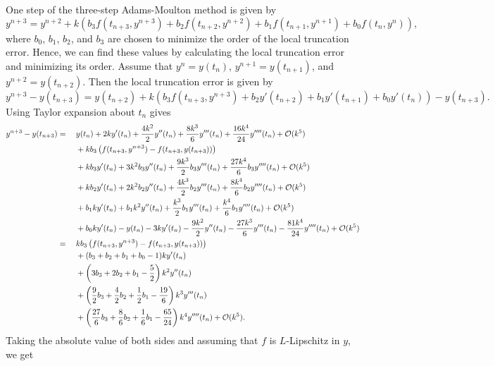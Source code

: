 \documentclass{homework}
\begin{document}
	One step of the three-step Adams-Moulton method is given by
	\begin{equation*}
		y^{n+3} = y^{n+2} + k\left(b_3f(t_{n+3}, y^{n+3}) + b_2f(t_{n+2}, y^{n+2}) + b_1f(t_{n+1}, y^{n+1}) + b_0f(t_n, y^n)\right),
	\end{equation*}
	where $b_0$, $b_1$, $b_2$, and $b_3$ are chosen to minimize the order of the local truncation error.  Hence, we can find these values by calculating the local truncation error and minimizing its order. Assume that $y^n = y(t_n)$, $y^{n+1} = y(t_{n+1})$, and $y^{n+2} = y(t_{n+2})$. Then the local truncation error is given by
	\begin{equation*}
		y^{n+3} - y(t_{n+3}) = y(t_{n+2}) + k\left(b_3f(t_{n+3}, y^{n+3}) + b_2y'(t_{n+2}) + b_1y'(t_{n+1}) + b_0y'(t_n)\right) - y(t_{n+3}).
	\end{equation*}
	Using Taylor expansion about $t_n$ gives
	\begin{alignat*}{2}
		y^{n+3} - y(t_{n+3}) &={}&  &y(t_n) + 2ky'(t_n) + \frac{4k^2}{2}y''(t_n) + \frac{8k^3}{6}y'''(t_n) + \frac{16k^4}{24}y''''(t_n) + \mathcal{O}(k^5) \\
		&&& + kb_3\left(f(t_{n+3}, y^{n+3}) - f(t_{n+3}, y(t_{n+3}))\right) \\
		&&& + kb_3y'(t_n) + 3k^2b_3y''(t_n) + \frac{9k^3}{2}b_3y'''(t_n) + \frac{27k^4}{6}b_3y''''(t_n) + \mathcal{O}(k^5) \\
		&&& + kb_2y'(t_n) + 2k^2b_2y''(t_n) + \frac{4k^3}{2}b_2y'''(t_n) + \frac{8k^4}{6}b_2y''''(t_n) + \mathcal{O}(k^5) \\
		&&& + b_1ky'(t_n) + b_1k^2y''(t_n) + \frac{k^3}{2}b_1y'''(t_n) + \frac{k^4}{6}b_1y''''(t_n) + \mathcal{O}(k^5) \\
		&&& + b_0ky'(t_n) - y(t_n) - 3ky'(t_n) - \frac{9k^2}{2}y''(t_n) - \frac{27k^3}{6}y'''(t_n) - \frac{81k^4}{24}y''''(t_n) + \mathcal{O}(k^5) \\
		&={}&&  kb_3\left(f(t_{n+3}, y^{n+3}) - f(t_{n+3}, y(t_{n+3}))\right) \\
		&&& + (b_3 + b_2 + b_1 + b_0 - 1)ky'(t_n) \\
		&&& + \left(3b_3 + 2b_2 + b_1 -\frac{5}{2}\right)k^2y''(t_n) \\
		&&& + \left(\frac{9}{2}b_3 + \frac{4}{2}b_2 + \frac{1}{2}b_1 -\frac{19}{6}\right)k^3y'''(t_n) \\
		&&& + \left(\frac{27}{6}b_3 + \frac{8}{6}b_2 + \frac{1}{6}b_1-\frac{65}{24}\right)k^4y''''(t_n) + \mathcal{O}(k^5).
	\end{alignat*}
	Taking the absolute value of both sides and assuming that $f$ is $L$-Lipschitz in $y$, we get
\end{document}
